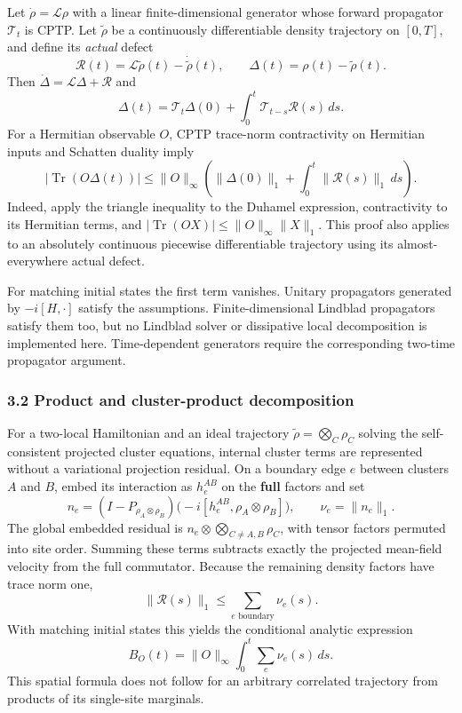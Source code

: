 \documentclass[
]{article}
\begin{document}
Let \(\dot\rho=\mathcal L\rho\) with a linear finite-dimensional generator whose forward propagator \(\mathcal T_t\) is CPTP. Let \(\widetilde\rho\) be a continuously differentiable density trajectory on \([0,T]\), and define its \emph{actual} defect
\[
\mathcal R(t)=\mathcal L\widetilde\rho(t)-\dot{\widetilde\rho}(t),
\qquad \Delta(t)=\rho(t)-\widetilde\rho(t).
\]
Then \(\dot\Delta=\mathcal L\Delta+\mathcal R\) and
\[
\Delta(t)=\mathcal T_t\Delta(0)+
\int_0^t\mathcal T_{t-s}\mathcal R(s)\,ds.
\]
For a Hermitian observable \(O\), CPTP trace-norm contractivity on Hermitian inputs and Schatten duality imply
\[
\boxed{
|\operatorname{Tr}(O\Delta(t))|
\le \|O\|_\infty
\left(\|\Delta(0)\|_1+
\int_0^t\|\mathcal R(s)\|_1\,ds\right).
}
\]
Indeed, apply the triangle inequality to the Duhamel expression, contractivity to its Hermitian terms, and
\(|\operatorname{Tr}(OX)|\le\|O\|_\infty\|X\|_1\).
This proof also applies to an absolutely continuous piecewise differentiable trajectory using its almost-everywhere actual defect.

For matching initial states the first term vanishes. Unitary propagators generated by \(-i[H,\cdot]\) satisfy the assumptions. Finite-dimensional Lindblad propagators satisfy them too, but no Lindblad solver or dissipative local decomposition is implemented here. Time-dependent generators require the corresponding two-time propagator argument.

\subsubsection{3.2 Product and cluster-product decomposition}\label{product-and-cluster-product-decomposition}

For a two-local Hamiltonian and an ideal trajectory
\(\widetilde\rho=\bigotimes_C\rho_C\) solving the self-consistent projected cluster equations, internal cluster terms are represented without a variational projection residual. On a boundary edge \(e\) between clusters \(A\) and \(B\), embed its interaction as \(h_e^{AB}\) on the \textbf{full} factors and set
\[
n_e=(I-P_{\rho_A\otimes\rho_B})
\bigl(-i[h_e^{AB},\rho_A\otimes\rho_B]\bigr),
\qquad \nu_e=\|n_e\|_1.
\]
The global embedded residual is \(n_e\otimes\bigotimes_{C\ne A,B}\rho_C\),
with tensor factors permuted into site order. Summing these terms subtracts exactly the projected mean-field velocity from the full commutator. Because the remaining density factors have trace norm one,
\[
\|\mathcal R(s)\|_1\le\sum_{e\text{ boundary}}\nu_e(s).
\]
With matching initial states this yields the conditional analytic expression
\[
B_O(t)=\|O\|_\infty\int_0^t\sum_e\nu_e(s)\,ds.
\]
This spatial formula does not follow for an arbitrary correlated trajectory from products of its single-site marginals.
\end{document}
